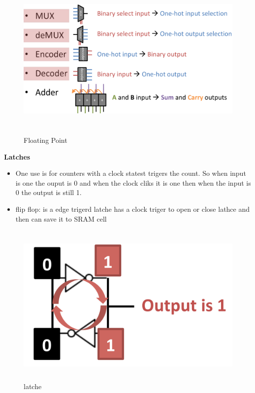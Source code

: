 \begin{figure}[h]
    \vspace{10mm}
    \centering
    \includegraphics[width=16cm, height=8cm]{image/important-logic-blocks.png} 
    \caption{Floating Point}
\end{figure}

\textbf{Latches}
\begin{itemize}
\item  One use is for counters with a clock statest trigers the count.
  So when input is one the ouput is 0 and when the clock cliks it is one then when the input is
  0 the output is still 1.
\item flip flop: is a edge trigerd latche has a clock triger to open or close lathce and then can save it to SRAM cell
\end{itemize}

\begin{figure}[h]
    \vspace{10mm}
    \centering
    \includegraphics[width=16cm, height=8cm]{image/latche.png} 
    \caption{latche}
\end{figure}

